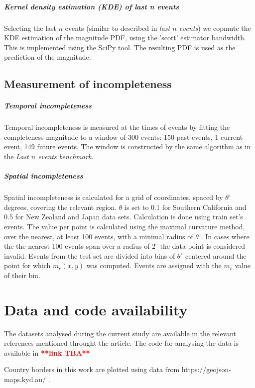 \documentclass[pdflatex]{sn-jnl}
\begin{document}
\subparagraph{Kernel density estimation (KDE) of last n events} Selecting the last $n$ events (similar to described in \textit{last $n$ events}) we copmute the KDE estimation of the magnitude PDF, using the 'scott' estimator bandwidth\cite{scott_2015}. This is implemented using the SciPy tool\cite{scipy_2020}. The resulting PDF is used as the prediction of the magnitude.

\subsection{Measurement of incompleteness}
\subparagraph{Temporal incompleteness} Temporal incompleteness is measured at the times of events by fitting the completeness magnitude to a window of 300 events: 150 past events, 1 current event, 149 future events. The window is constructed by the same algorithm as in the \textit{Last $n$ events benchmark}.

\subparagraph{Spatial incompleteness} Spatial incompleteness is calculated for a grid of coordinates, spaced by $\theta^\circ$ degrees, covering the relevant region. $\theta$ is set to 0.1 for Southern California and 0.5 for New Zealand and Japan data sets. Calculation is done using train set's events. The value per point is calculated using the maximal curvature method\cite{wiemer_minimum_2000}, over the nearest, at least 100 events, with a minimal radius of $\theta^\circ$. In cases where the the nearest 100 events span over a radius of $2^\circ$ the data point is considered invalid. Events from the test set are divided into bins of $\theta^\circ$ centered around the point for which $m_c(x,y)$ was computed. Events are assigned with the $m_c$ value of their bin.


\section*{Data and code availability}
The datasets analysed during the current study are available in the relevant references mentioned throught the article.
The code for analysing the data is available in \textcolor{red}{\textbf{**link TBA**}}

Country borders in this work are plotted using data from https://geojson-maps.kyd.au/ .
\end{document}
